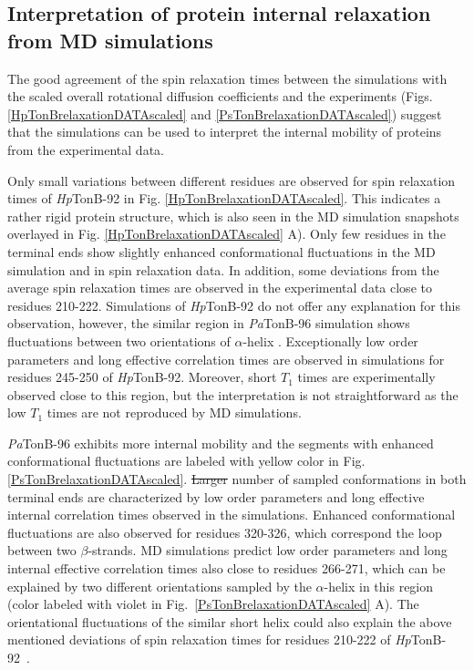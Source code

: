 \documentclass[journal=jpcbfk,manuscript=article]{achemso}
\providecommand{\DIFadd}[1]{{\protect\color{blue}\uwave{#1}}} %
\providecommand{\DIFdel}[1]{{\protect\color{red}\sout{#1}}}                      %
\providecommand{\DIFaddbegin}{} %
\providecommand{\DIFaddend}{} %
\providecommand{\DIFdelbegin}{} %
\providecommand{\DIFdelend}{} %
\begin{document}
\subsection{Interpretation of protein internal relaxation from MD simulations}
The good agreement of the spin relaxation times between the simulations
with the scaled overall rotational diffusion coefficients and
the experiments (Figs. \ref{HpTonBrelaxationDATAscaled} and \ref{PsTonBrelaxationDATAscaled})
suggest that the simulations can be used to interpret the internal
mobility of proteins from the experimental data.

Only small variations between different residues are observed
for spin relaxation times of {\it Hp}TonB-92 in Fig. \ref{HpTonBrelaxationDATAscaled}.
This indicates a rather rigid protein structure, which is also seen in
the MD simulation snapshots overlayed in Fig. \ref{HpTonBrelaxationDATAscaled} A).
Only few residues in the terminal ends show slightly
enhanced conformational fluctuations in the MD simulation and in
spin relaxation data. In addition, some deviations from the average spin relaxation times
are observed in the experimental data close to residues 210-222.
Simulations of {\it Hp}TonB-92 do not offer any explanation for this
observation, however, the similar region in {\it Pa}TonB-96 simulation shows 
fluctuations between two orientations of $\alpha$-helix \cite{oeemig17}.
Exceptionally low order parameters and long effective correlation times 
are observed in simulations for residues 245-250 of {\it Hp}TonB-92.
Moreover, short $T_1$ times are experimentally observed close to this region,
but the interpretation is not straightforward as the low $T_1$ times
are not reproduced by MD simulations.

{\it Pa}TonB-96 exhibits more internal mobility 
and the segments with enhanced conformational fluctuations are labeled with yellow color
in Fig. \ref{PsTonBrelaxationDATAscaled}.
\DIFdelbegin \DIFdel{Larger }\DIFdelend \DIFaddbegin \DIFadd{The larger }\DIFaddend number of sampled conformations in both terminal ends
are characterized by \DIFaddbegin \DIFadd{the }\DIFaddend low order parameters and long effective internal correlation times
observed in the simulations. 
Enhanced conformational fluctuations are also observed for residues 320-326,
which correspond the loop between two $\beta$-strands.
MD simulations predict low order parameters and long internal effective correlation
times also close to residues 266-271, which can be explained by  
two different orientations sampled by the $\alpha$-helix in this region
(color labeled with violet in Fig.~\ref{PsTonBrelaxationDATAscaled} A).
The orientational fluctuations of the similar short helix could also explain the above mentioned
deviations of spin relaxation times for residues 210-222 of {\it Hp}TonB-92~\cite{ciragan16}.
\end{document}
